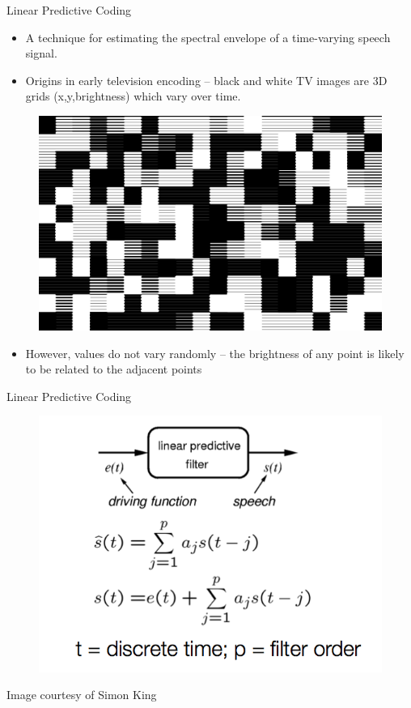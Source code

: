 \documentclass{beamer}
\begin{document}
\begin{frame}
Linear Predictive Coding
\begin{itemize}
\item{A technique for estimating the spectral envelope of a time-varying speech signal.}
\item{Origins in early television encoding -- black and white TV images are 3D grids (x,y,brightness) which vary over time.}
\end{itemize}
\begin{figure}
\centering
\includegraphics[scale=0.05,keepaspectratio]{bw_tv.jpg}
\end{figure}
\begin{itemize}
\item{However, values do not vary randomly -- the brightness of any point is likely to be related to the adjacent points}
\end{itemize}
\end{frame}
\begin{frame}
Linear Predictive Coding
\begin{figure}
\centering
\includegraphics[scale=0.4,keepaspectratio]{linear_predictive_filter.png}
\end{figure}
\footnotesize{Image courtesy of Simon King}
\end{frame}
\end{document}
